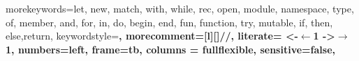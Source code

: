 \usepackage{listings}
\usepackage{color}
    {morekeywords={let, new, match, with, while, rec, open, module, namespace, type, of, member, and, for, in, do, begin, end, fun, function, try, mutable, if, then, else,return}, 
    keywordstyle=\bfseries,
    morecomment=[l][\color{graycomments}]{//},
    literate=
        {<-}{$\leftarrow{}$}{1}
        {->}{$\rightarrow{}$}{1},
    numbers=left,
    frame=tb,
    columns = fullflexible,
    sensitive=false,
    }
